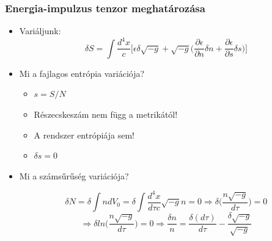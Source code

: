 \documentclass{beamer}
\begin{document}
\begin{frame}
\frametitle{Energia-impulzus tenzor meghatározása}
\begin{itemize}
\item Variáljunk: 
\begin{equation*}
\delta S=\int \frac{d^4 x}{c}\bigg[\epsilon \delta \sqrt{-g}+\sqrt{-g}\bigg(\frac{\partial\epsilon}{\partial n}\delta n+\frac{\partial \epsilon}{\partial s}\delta s\bigg)\bigg]
\end{equation*}
\item Mi a fajlagos entrópia variációja?
\begin{itemize}
\item $s=S/N$
\item Részecskeszám nem függ a metrikától!
\item A rendszer entrópiája sem!
\item $\delta s= 0$
\end{itemize}
\item Mi a számsűrűség variációja?

\begin{equation*}
\delta N = \delta \int n dV_0= \delta \int \frac{d^4x}{d\tau c}\sqrt{-g}n=0\Rightarrow \delta\bigg(\frac{n\sqrt{-g}}{d\tau}\bigg)=0
\end{equation*}
\begin{equation*}
\Rightarrow  \delta ln\bigg(\frac{n\sqrt{-g}}{d\tau}\bigg)=0 \Rightarrow \frac{\delta n}{n}=\frac{\delta(d\tau)}{d\tau}-\frac{\delta\sqrt{-g}}{\sqrt{-g}}
\end{equation*}

\end{itemize}


\end{frame}
\end{document}
